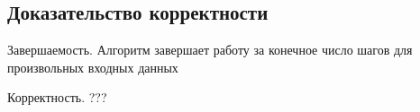 \subsection{Доказательство корректности}

\begin{theorem}{Завершаемость.}
	Алгоритм завершает работу за конечное число шагов для произвольных входных данных
\end{theorem}

\begin{theorem}{Корректность.}
	???
\end{theorem}